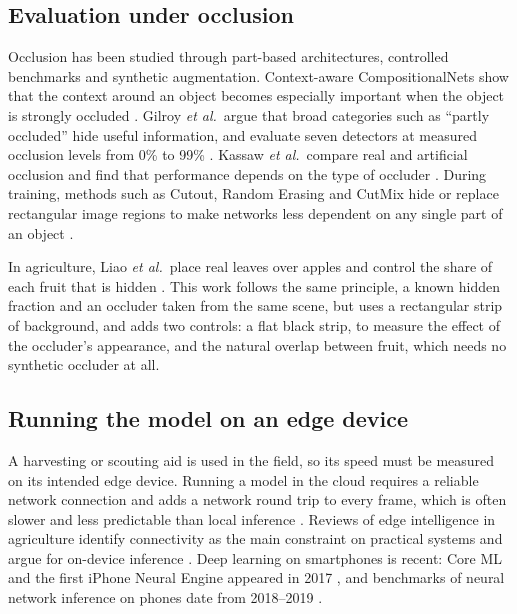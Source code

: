 \subsection{Evaluation under occlusion}

Occlusion has been studied through part-based architectures, controlled
benchmarks and synthetic augmentation. Context-aware CompositionalNets show
that the context around an object becomes especially important when the object
is strongly occluded \cite{wang2020robust}. Gilroy \emph{et al.}\ argue that
broad categories such as ``partly occluded'' hide useful information, and
evaluate seven detectors at measured occlusion levels from 0\% to 99\%
\cite{gilroy2023benchmark}. Kassaw \emph{et al.}\ compare real and artificial
occlusion and find that performance depends on the type of occluder
\cite{kassaw2026occlusion}. During training, methods such as Cutout, Random
Erasing and CutMix hide or replace rectangular image regions to make networks
less dependent on any single part of an object \cite{devries2017cutout, zhong2020randomerasing,
yun2019cutmix}.

In agriculture, Liao \emph{et al.}\ place real leaves over apples and control
the share of each fruit that is hidden \cite{liao2025amodal}. This work follows
the same principle, a known hidden fraction and an occluder taken from the same
scene, but uses a rectangular strip of background, and adds two controls: a
flat black strip, to measure the effect of the occluder's appearance, and the
natural overlap between fruit, which needs no synthetic occluder at all.

\subsection{Running the model on an edge device}

A harvesting or scouting aid is used in the field, so its speed must be
measured on its intended edge device. Running a model in the cloud requires
a reliable network connection and adds a network round trip to every frame,
which is often slower and less predictable than local inference
\cite{kang2017neurosurgeon, shi2016edge}. Reviews of edge intelligence in agriculture identify
connectivity as the main constraint on practical systems and argue for
on-device inference \cite{shaheen2023edge}. Deep learning on smartphones is
recent: Core ML and the first iPhone Neural Engine appeared in 2017
\cite{apple2017ios11, apple2017iphonex}, and benchmarks of neural network inference on phones date
from 2018--2019 \cite{ignatov2019aibenchmark}.


